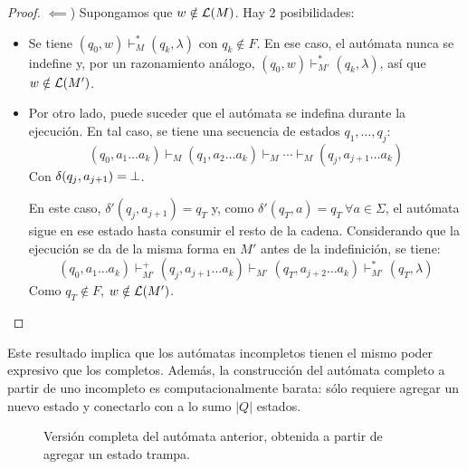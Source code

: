 \begin{proof}
    $\impliedby$) Supongamos que $w \notin \mathcal{L}(M)$. Hay 2 posibilidades:
    \begin{itemize}
        \item Se tiene $(q_0, w) \vdash_M^* (q_k, \lambda)$ con $q_k \notin F$. En ese caso, el autómata nunca se indefine y, por un razonamiento análogo, $(q_0, w) \vdash_{M'}^* (q_k, \lambda)$, así que $w \notin \mathcal{L}(M')$.
        \item Por otro lado, puede suceder que el autómata se indefina durante la ejecución. En tal caso, se tiene una secuencia de estados $q_1, \dots, q_j$:
              $$(q_0, a_1 \dots a_k) \vdash_M (q_1, a_2 \dots a_k) \vdash_M \cdots \vdash_M (q_j, a_{j+1} \dots a_k)$$
              Con $\delta(q_j, a_{j+1}) = \mathrm \perp$.

              En este caso, $\delta' (q_j, a_{j+1}) = q_T$ y, como $\delta'(q_T, a) = q_T\ \forall a \in \Sigma$, el autómata sigue en ese estado hasta consumir el resto de la cadena. Considerando que la ejecución se da de la misma forma en $M'$ antes de la indefinición, se tiene:
              $$(q_0, a_1 \dots a_k) \vdash_{M'}^+ (q_j, a_{j+1} \dots a_k) \vdash_{M'} (q_T, a_{j+2} \dots a_k) \vdash_{M'}^* (q_T, \lambda)$$
              Como $q_T \notin F$, $w \notin \mathcal{L}(M')$.
    \end{itemize}
\end{proof}

Este resultado implica que los autómatas incompletos tienen el mismo poder expresivo que los completos. Además, la construcción del autómata completo a partir de uno incompleto es computacionalmente barata: sólo requiere agregar un nuevo estado y conectarlo con a lo sumo $|Q|$ estados.

\begin{figure}[H]
    \centering
    \caption*{Versión completa del autómata anterior, obtenida a partir de agregar un estado trampa.}
\end{figure}
